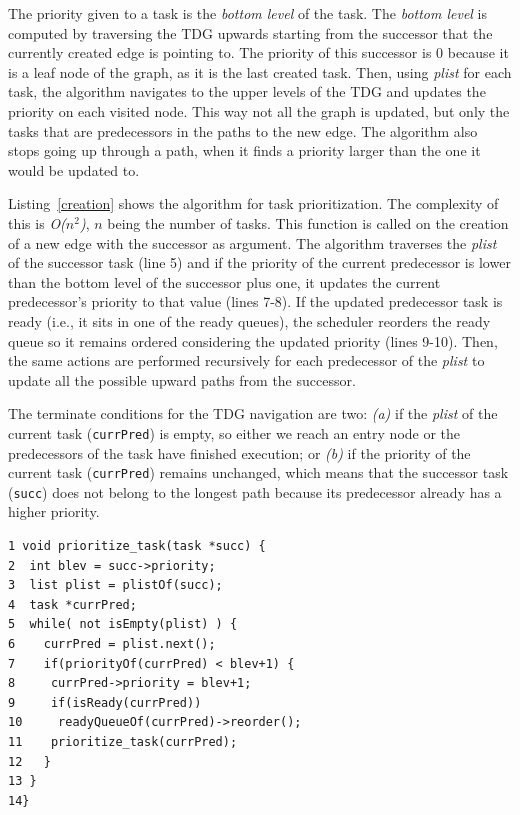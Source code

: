 
The priority given to a task is the \textit{bottom level} of the task. The \textit{bottom level} is computed by traversing the TDG upwards starting from the successor that the currently created edge is pointing to. The priority of this successor is 0 because it is a leaf node of the graph, as it is the last created task. Then, using \textit{plist} for each task, the algorithm navigates to the upper levels of the TDG and updates the priority on each visited node. This way not all the graph is updated, but only the tasks that are predecessors in the paths to the new edge. The algorithm also stops going up through a path, when it finds a priority larger than the one it would be updated to.

Listing~\ref{creation} shows the algorithm for task prioritization. The complexity of this is \textit{O($n^2$)}, \textit{$n$} being the number of tasks. This function is called on the creation of a new edge with the successor as argument. The algorithm traverses the \textit{plist} of the successor task (line 5) and if the priority of the current predecessor is lower than the bottom level of the successor plus one, it updates the current predecessor's priority to that value (lines 7-8). If the updated predecessor task is ready (i.e., it sits in one of the ready queues), the scheduler reorders the ready queue so it remains ordered considering the updated priority (lines 9-10). Then, the same actions are performed recursively for each predecessor of the \textit{plist} to update all the possible upward paths from the successor. 

The terminate conditions for the TDG navigation are two: \textit{(a)} if the \textit{plist} of the current task (\texttt{currPred}) is empty, so either we reach an entry node or the predecessors of the task have finished execution; or \textit{(b)} if the priority of the current task (\texttt{currPred}) remains unchanged, which means that the successor task (\texttt{succ}) does not belong to the longest path because its predecessor already has a higher priority. 
\begin{lstlisting}[float, emph={void,if,return,non_critical_queue, critical_queue,prioritize_task}, captionpos=b, caption={Pseudo-code task prioritization with CATS.},label=creation, emph={[2]mat}, emphstyle={[2]}, aboveskip={0\baselineskip}, frame=tb, belowskip={-0.4cm}]
1 void prioritize_task(task *succ) {
2  int blev = succ->priority;
3  list plist = plistOf(succ);
4  task *currPred;
5  while( not isEmpty(plist) ) {
6    currPred = plist.next();  
7    if(priorityOf(currPred) < blev+1) {
8     currPred->priority = blev+1;
9     if(isReady(currPred)) 
10     readyQueueOf(currPred)->reorder();
11    prioritize_task(currPred);
12   }
13 }
14}
\end{lstlisting}
